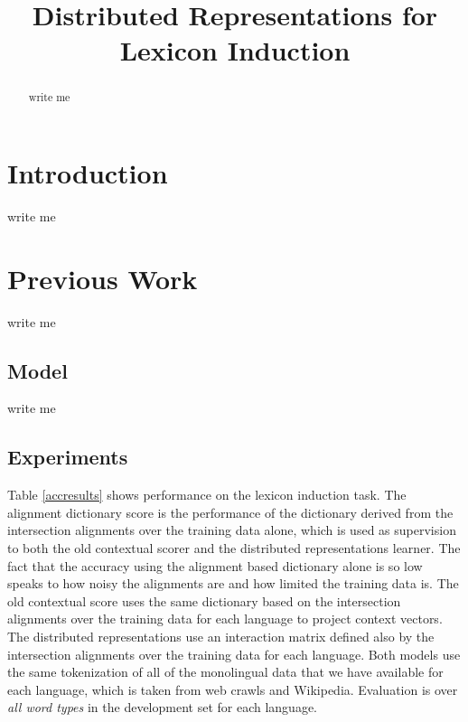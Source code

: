 \documentclass[11pt,letterpaper]{article}
\title{Distributed Representations for Lexicon Induction}
\date{}
\begin{document}
\maketitle
\begin{abstract}
write me
\end{abstract}

\section{Introduction}
write me

\section{Previous Work}
write me

\subsection{Model}
write me

\subsection{Experiments}

Table \ref{accresults} shows performance on the lexicon induction task. 
The alignment dictionary score is the performance of the dictionary derived from the intersection alignments over the training data alone, which is used as supervision to both the old contextual scorer and the distributed representations learner.
The fact that the accuracy using the alignment based dictionary alone is so low speaks to how noisy the alignments are and how limited the training data is.
The old contextual score uses the same dictionary based on the intersection alignments over the training data for each language to project context vectors.
The distributed representations use an interaction matrix defined also by the intersection alignments over the training data for each language.
Both models use the same tokenization of all of the monolingual data that we have available for each language, which is taken from web crawls and Wikipedia.
Evaluation is over {\it all word types} in the development set  for each language.
\end{document}
